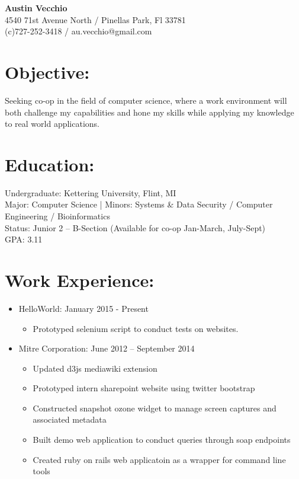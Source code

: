 \documentclass{res}
\begin{document}
\begin{center}
\LARGE{\textbf{Austin Vecchio}}\\
\normalsize{
4540 71st Avenue North / Pinellas Park, Fl 33781\\
(c)727-252-3418 / au.vecchio@gmail.com
}
\end{center}

\section{Objective:}
Seeking co-op in the field of computer science, where a work environment will both challenge my capabilities and hone my skills while applying my knowledge to real world applications.\\

\section{Education:}

Undergraduate: Kettering University, Flint, MI\\
Major: Computer Science %
|   Minors: Systems \& Data Security / Computer Engineering / Bioinformatics\\
Status: Junior 2 – B-Section (Available for co-op Jan-March, July-Sept)\\
GPA: 3.11

\section{Work Experience:}
\begin{itemize}
\item HelloWorld: \hspace{45pt} January 2015 - Present
\begin{itemize}[label=$\circ$]
\item Prototyped selenium script to conduct tests on websites.
\end{itemize}
\item Mitre Corporation: \hspace{45pt} June 2012 – September 2014
\begin{itemize}[label=$\circ$]
\item Updated d3js mediawiki extension
\item Prototyped intern sharepoint website using twitter bootstrap
\item Constructed snapshot ozone widget to manage screen captures and associated metadata
\item Built demo web application to conduct queries through soap endpoints
\item Created ruby on rails web applicatoin as a wrapper for command line tools
\end{itemize}
\end{itemize}
\end{document}
